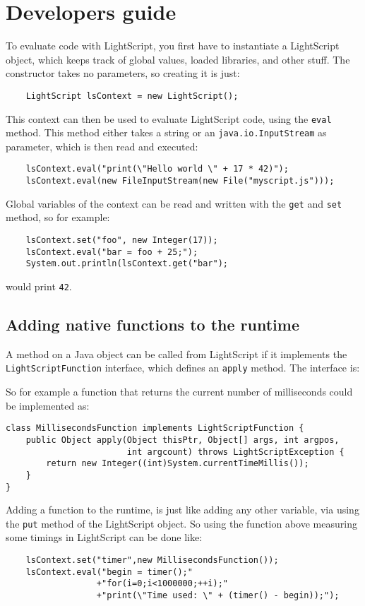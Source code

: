 \documentclass[11pt]{report}
\begin{document}
\section{Developers guide}
To evaluate code with LightScript, you first have to instantiate a LightScript object, which keeps track of global values, loaded libraries, and other stuff. The constructor takes no parameters, so creating it is just:
\begin{lstlisting}
    LightScript lsContext = new LightScript();
\end{lstlisting}
This context can then be used to evaluate LightScript code, using the \verb|eval| method. This method either takes a string or an \verb|java.io.InputStream| as parameter, which is then read and executed:
\begin{lstlisting}
    lsContext.eval("print(\"Hello world \" + 17 * 42)");
    lsContext.eval(new FileInputStream(new File("myscript.js")));
\end{lstlisting}
Global variables of the context can be read and written with the \verb|get| and \verb|set| method, so for example:
\begin{lstlisting}
    lsContext.set("foo", new Integer(17));
    lsContext.eval("bar = foo + 25;");
    System.out.println(lsContext.get("bar");
\end{lstlisting}
would print \verb|42|.

\subsection{Adding native functions to the runtime}

A method on a Java object can be called from LightScript if it implements the \verb|LightScriptFunction| interface, which defines an \verb|apply| method.
The interface is:

So for example a function that returns the current number of milliseconds could be implemented as:
\begin{lstlisting}
class MillisecondsFunction implements LightScriptFunction {
    public Object apply(Object thisPtr, Object[] args, int argpos, 
                        int argcount) throws LightScriptException {
        return new Integer((int)System.currentTimeMillis());
    }
}
\end{lstlisting}

Adding a function to the runtime, is just like adding any other variable,
via using the \verb|put| method of the LightScript object.
So using the function above measuring some timings in LightScript can be done like:
\begin{lstlisting}
    lsContext.set("timer",new MillisecondsFunction());
    lsContext.eval("begin = timer();"
                  +"for(i=0;i<1000000;++i);"
                  +"print(\"Time used: \" + (timer() - begin));");
\end{lstlisting}
\end{document}
